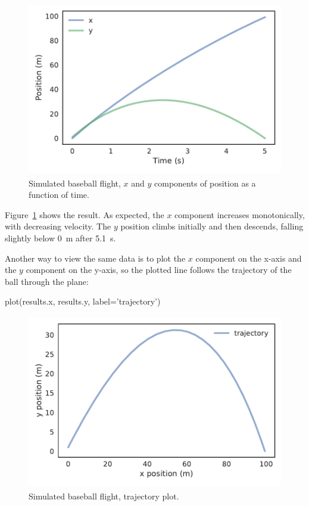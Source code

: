 \documentclass[12pt]{book}
\theoremstyle{exercise}
\begin{document}
\begin{figure}
\centerline{\includegraphics[height=3in]{figs/chap10-fig01.pdf}}
\caption{Simulated baseball flight, $x$ and $y$ components of position as a function of time.}
\label{chap10-fig01}
\end{figure}

Figure~\ref{chap10-fig01} shows the result.  As expected, the $x$ component increases monotonically, with decreasing velocity.  The $y$ position climbs initially and then descends, falling slightly below \SI{0}{\meter} after \SI{5.1}{\second}.


Another way to view the same data is to plot the $x$ component on the x-axis and the $y$ component on the y-axis, so the plotted line follows the trajectory of the ball through the plane:

\begin{python}
plot(results.x, results.y, label='trajectory')
\end{python}

\begin{figure}
\centerline{\includegraphics[height=3in]{figs/chap10-fig02.pdf}}
\caption{Simulated baseball flight, trajectory plot.}
\label{chap10-fig02}
\end{figure}
\end{document}
